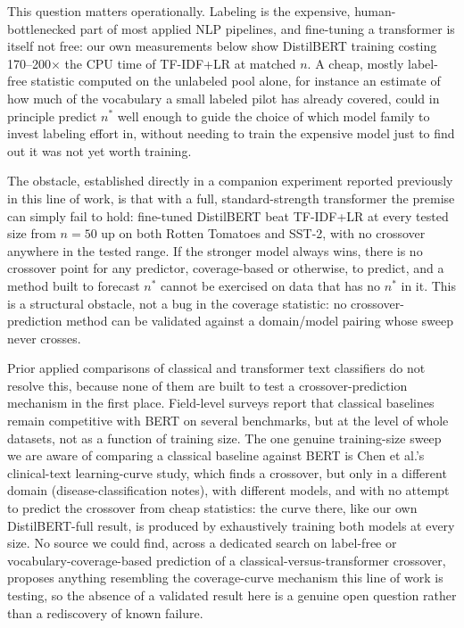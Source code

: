 \documentclass[11pt,letterpaper]{article}
\begin{document}
This question matters operationally. Labeling is the expensive, human-bottlenecked part of most applied NLP pipelines, and fine-tuning a transformer is itself not free: our own measurements below show DistilBERT training costing 170--200$\times$ the CPU time of TF-IDF+LR at matched $n$. A cheap, mostly label-free statistic computed on the unlabeled pool alone, for instance an estimate of how much of the vocabulary a small labeled pilot has already covered, could in principle predict $n^*$ well enough to guide the choice of which model family to invest labeling effort in, without needing to train the expensive model just to find out it was not yet worth training.

The obstacle, established directly in a companion experiment reported previously in this line of work, is that with a full, standard-strength transformer the premise can simply fail to hold: fine-tuned DistilBERT beat TF-IDF+LR at every tested size from $n{=}50$ up on both Rotten Tomatoes and SST-2, with no crossover anywhere in the tested range. If the stronger model always wins, there is no crossover point for any predictor, coverage-based or otherwise, to predict, and a method built to forecast $n^*$ cannot be exercised on data that has no $n^*$ in it. This is a structural obstacle, not a bug in the coverage statistic: no crossover-prediction method can be validated against a domain/model pairing whose sweep never crosses.

Prior applied comparisons of classical and transformer text classifiers do not resolve this, because none of them are built to test a crossover-prediction mechanism in the first place. Field-level surveys report that classical baselines remain competitive with BERT on several benchmarks, but at the level of whole datasets, not as a function of training size. The one genuine training-size sweep we are aware of comparing a classical baseline against BERT is Chen et al.'s clinical-text learning-curve study, which finds a crossover, but only in a different domain (disease-classification notes), with different models, and with no attempt to predict the crossover from cheap statistics: the curve there, like our own DistilBERT-full result, is produced by exhaustively training both models at every size. No source we could find, across a dedicated search on label-free or vocabulary-coverage-based prediction of a classical-versus-transformer crossover, proposes anything resembling the coverage-curve mechanism this line of work is testing, so the absence of a validated result here is a genuine open question rather than a rediscovery of known failure.
\end{document}
